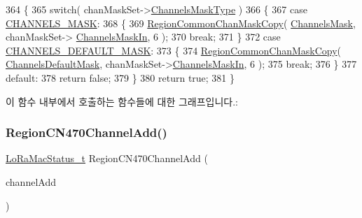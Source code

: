 \begin{DoxyCode}
364 \{
365     \textcolor{keywordflow}{switch}( chanMaskSet->\mbox{\hyperlink{structs_chan_mask_set_params_a02b75be74cbc34fa2126b2c250ea9283}{ChannelsMaskType}} )
366     \{
367         \textcolor{keywordflow}{case} \mbox{\hyperlink{group___r_e_g_i_o_n_gga7a62e669f567fc160ad58210664bca9ca1e68275c0b16a0c4935eada4315dd089}{CHANNELS\_MASK}}:
368         \{
369             \mbox{\hyperlink{group___r_e_g_i_o_n_c_o_m_m_o_n_ga95f5199d490113269fae7f2e0569e9a0}{RegionCommonChanMaskCopy}}( \mbox{\hyperlink{_region_c_n470_8c_a2188957b5ca6af8092154d7ccbfa5757}{ChannelsMask}}, chanMaskSet->
      \mbox{\hyperlink{structs_chan_mask_set_params_ade387d6ecaf27781b14ad97ebdfc0695}{ChannelsMaskIn}}, 6 );
370             \textcolor{keywordflow}{break};
371         \}
372         \textcolor{keywordflow}{case} \mbox{\hyperlink{group___r_e_g_i_o_n_gga7a62e669f567fc160ad58210664bca9ca9bbb18c8600ad8781ba04a2cb121ea60}{CHANNELS\_DEFAULT\_MASK}}:
373         \{
374             \mbox{\hyperlink{group___r_e_g_i_o_n_c_o_m_m_o_n_ga95f5199d490113269fae7f2e0569e9a0}{RegionCommonChanMaskCopy}}( 
      \mbox{\hyperlink{_region_c_n470_8c_ac127b19779301713d5ed92eb03366a2d}{ChannelsDefaultMask}}, chanMaskSet->\mbox{\hyperlink{structs_chan_mask_set_params_ade387d6ecaf27781b14ad97ebdfc0695}{ChannelsMaskIn}}, 6 );
375             \textcolor{keywordflow}{break};
376         \}
377         \textcolor{keywordflow}{default}:
378             \textcolor{keywordflow}{return} \textcolor{keyword}{false};
379     \}
380     \textcolor{keywordflow}{return} \textcolor{keyword}{true};
381 \}
\end{DoxyCode}
이 함수 내부에서 호출하는 함수들에 대한 그래프입니다.\+:
\mbox{\label{group___r_e_g_i_o_n_c_n470_ga6f447bc77fedcf05b61c6a4247b0972b}} 
\subsubsection{\texorpdfstring{Region\+C\+N470\+Channel\+Add()}{RegionCN470ChannelAdd()}}
{\footnotesize\ttfamily \mbox{\hyperlink{group___l_o_r_a_m_a_c_ga30bd25657e10480f8605ee951b0ecfbd}{Lo\+Ra\+Mac\+Status\+\_\+t}} Region\+C\+N470\+Channel\+Add (\begin{DoxyParamCaption}\item[{\mbox{\hyperlink{group___r_e_g_i_o_n_gab1c5f3aa06614283202906cef4417860}{Channel\+Add\+Params\+\_\+t}} $\ast$}]{channel\+Add }\end{DoxyParamCaption})}




